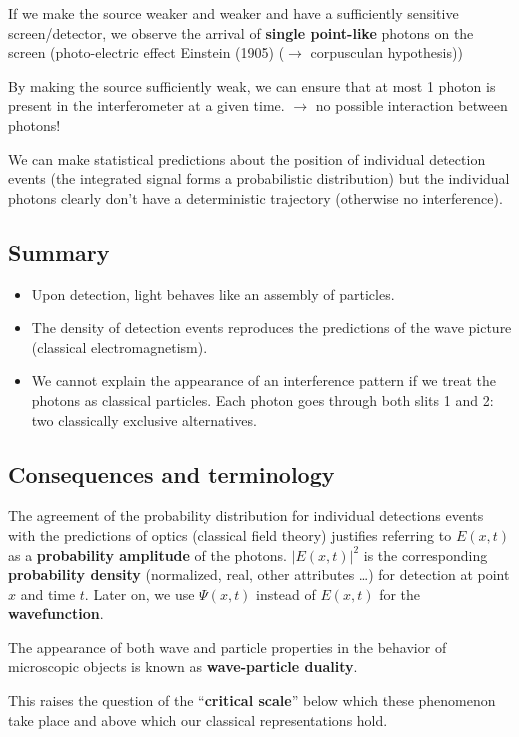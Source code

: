 \noindent
\hft

\noindent
If we make the source weaker and weaker and have a sufficiently sensitive screen/detector, we observe the arrival of \textbf{single point-like} photons on the screen (photo-electric effect Einstein (1905) ($ \to $ corpusculan hypothesis))\par
By making the source sufficiently weak, we can ensure that at most 1 photon is present in the interferometer at a given time. $ \rightarrow $ no possible interaction between photons!\par
\begin{center}
\end{center}
We can make statistical predictions about the position of individual detection events (the integrated signal forms a probabilistic distribution) but the individual photons clearly don't have a deterministic trajectory (otherwise no interference).

\subsection*{Summary}

\begin{itemize}
	\item Upon detection, light behaves like an assembly of particles.
	\item The density of detection events reproduces the predictions of the wave picture (classical electromagnetism).
	\item We cannot explain the appearance of an interference pattern if we treat the photons as classical particles. Each photon goes through both slits 1 and 2: two classically exclusive alternatives.
\end{itemize}

\subsection{Consequences and terminology}

The agreement of the probability distribution for individual detections events with the predictions of optics (classical field theory) justifies referring to $ E(x,t) $ as a \textbf{probability amplitude} of the photons. $ |E(x,t)|^2 $ is the corresponding \textbf{probability density} (normalized, real, other attributes \dots) for detection at point $ x $ and time $ t $. Later on, we use $ \Psi(x,t) $ instead of $ E(x,t) $ for the \textbf{wavefunction}.\par
The appearance of both wave and particle properties in the behavior of microscopic objects is known as \textbf{wave-particle duality}.\par
This raises the question of the ``\textbf{critical scale}'' below which these phenomenon take place and above which our classical representations hold.

